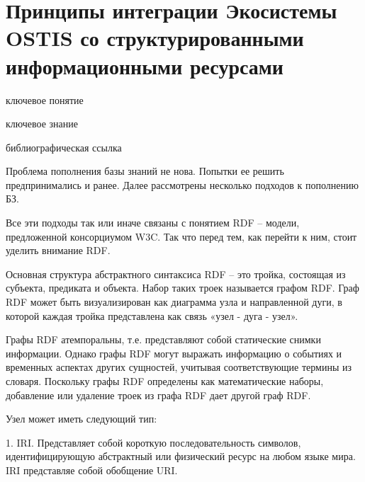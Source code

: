 \section{Принципы интеграции Экосистемы OSTIS со структурированными информационными ресурсами}
{\label{sec_integration_resources}} 

\begin{SCn}

    \bigskip
    
    \begin{scnrelfromlist}{ключевое понятие}
    \end{scnrelfromlist}
    
    \bigskip
    
    \begin{scnrelfromlist}{ключевое знание}
    \end{scnrelfromlist}
    
    \bigskip
    
    \begin{scnrelfromlist}{библиографическая ссылка}
    \end{scnrelfromlist}
    
    \end{SCn}

Проблема пополнения базы знаний не нова. Попытки ее решить предпринимались и ранее. Далее рассмотрены несколько подходов к пополнению БЗ.

Все эти подходы так или иначе связаны с понятием RDF – модели, предложенной консорциумом W3C. Так что перед тем, как перейти к ним, стоит уделить внимание RDF.

Основная структура абстрактного синтаксиса RDF – это тройка, состоящая из субъекта, предиката и объекта. Набор таких троек называется графом RDF. Граф RDF может быть визуализирован как диаграмма узла и направленной дуги, в которой каждая тройка представлена как связь «узел - дуга - узел».

Графы RDF атемпоральны, т.е. представляют собой статические снимки информации. Однако графы RDF могут выражать информацию о событиях и временных аспектах других сущностей, учитывая соответствующие термины из словаря. Поскольку графы RDF определены как математические наборы, добавление или удаление троек из графа RDF дает другой граф RDF.

Узел может иметь следующий тип:

1. IRI. Представляет собой короткую последовательность символов, идентифицирующую абстрактный или физический ресурс на любом языке мира. IRI представляе собой обобщение URI.

